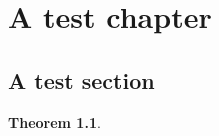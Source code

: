 \documentclass{amsbook}
\theoremstyle{spplain}
\newtheorem{theo}{Theorem}
\begin{document}
\chapter{A test chapter}
\section{A test section}
\begin{theo}
\lipsum[1]
\end{theo}
\lipsum[1-30]
\end{document}
